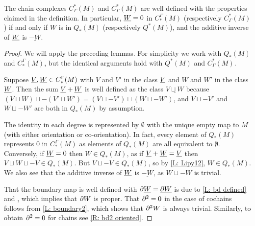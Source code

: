 \begin{lemma}\label{L: co/chains well defined}
	The chain complexes $C_\Gamma^*(M)$ and $C_\Gamma^*(M)$ are well defined with the properties claimed in the definition.
	In particular, $\underline{W} = 0$ in $C^\Gamma_*(M)$ (respectively $C_\Gamma^*(M)$) if and only if $W$ is in $Q_*(M)$ (respectively $Q^*(M)$), and the additive inverse of $\underline{W}$ is $\underline{-W}$.
\end{lemma}

\begin{proof}
	We will apply the preceding lemmas.
	For simplicity we work with $Q_*(M)$ and $C^\Gamma_*(M)$, but the identical arguments hold with $Q^*(M)$ and $C_\Gamma^*(M)$.

	Suppose $\underline{V},\underline{W} \in C^\Gamma_*(M)$ with $V$ and $V'$ in the class $\underline{V}$ and $W$ and $W'$ in the class $\underline{W}$.
	Then the sum $\underline{V}+\underline{W}$ is well defined as the class $\underline{V \sqcup W}$ because $(V \sqcup W) \sqcup -(V' \sqcup W') = (V \sqcup -V') \sqcup (W \sqcup -W')$, and $V \sqcup -V'$ and  $W \sqcup -W'$ are both in $Q_*(M)$ by assumption.

	The identity in each degree is represented by $\emptyset$ with the unique empty map to $M$ (with either orientation or co-orientation).
	In fact, every element of $Q_*(M)$ represents $0$ in $C^\Gamma_*(M)$ as elements of $Q_*(M)$ are all equivalent to $\emptyset$.
	Conversely, if $\underline{W} = 0$ then $W \in Q_*(M)$, as if $\underline{V}+\underline{W} = \underline{V}$ then $V \sqcup W \sqcup -V \in Q_*(M)$.
	But $V \sqcup -V \in Q_*(M)$, so by \cref{L: Lipy12}, $W \in Q_*(M)$.
	We also see that the additive inverse of $\underline{W}$ is $\underline{-W}$, as $W \sqcup -W$ is trivial.

	That the boundary map is well defined with $\partial \underline{W} = \underline{\partial W}$ is due to \cref{L: bd defined} and \cite[Lemma 2.8]{Joy12}, which implies that $\partial W$ is proper.
	That $\partial^2 = 0$ in the case of cochains follows from \cref{L: boundary2}, which shows that $\partial^2 W$ is always trivial.
	Similarly, to obtain $\partial^2 = 0$ for chains see \cref{R: bd2 oriented}.
\end{proof}

\begin{comment}
	Thom deeply considered the interplay between manifolds
	and homology \cite{Thom54}, and the cohomology classes we produce for submanifolds are equal to the pullbacks of Thom classes by Thom collapse maps.
	Similar objects were defined by Quillen \cite{Quil71} as an immediate translation of the data which encodes cobordism generalized cohomology theories.
	Thus, we name the QT-objects which represent equivalence classes of geometric cochains, defined below, in honor of Quillen and Thom.
\end{comment}

